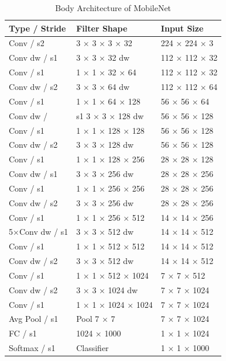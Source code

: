 \documentclass[12pt, a4paper,oneside]{report}
\begin{document}
\begin{table}[!htbp]
	\centering {} \small
	
	\begin{adjustbox}{max width=1.1\textwidth,center}
		
		\begin{tabular}{|p{3cm}|p{3cm}|p{3cm}|}
			\hline	
			Type / Stride & Filter Shape & Input Size \\ \hline
			
			Conv / s2 & 3 × 3 × 3 × 32 & 224 × 224 × 3 \\ \hline
			Conv dw / s1  &3 × 3 × 32 dw & 112 × 112 × 32 \\ \hline
			Conv / s1  & 1 × 1 × 32 × 64 & 112 × 112 × 32 \\ \hline
			Conv dw / s2 & 3 × 3 × 64 dw & 112 × 112 × 64 \\ \hline
			Conv / s1 & 1 × 1 × 64 × 128 & 56 × 56 × 64 \\ \hline
			Conv dw / & s1 3 × 3 × 128 dw & 56 × 56 × 128 \\ \hline
			Conv / s1 & 1 × 1 × 128 × 128 & 56 × 56 × 128 \\ \hline
			Conv dw / s2 & 3 × 3 × 128 dw & 56 × 56 × 128 \\ \hline
			Conv / s1 & 1 × 1 × 128 × 256 & 28 × 28 × 128 \\ \hline
			Conv dw / s1 & 3 × 3 × 256 dw & 28 × 28 × 256 \\ \hline
			Conv / s1 & 1 × 1 × 256 × 256 & 28 × 28 × 256 \\ \hline
			Conv dw / s2 & 3 × 3 × 256 dw & 28 × 28 × 256 \\ \hline
			Conv / s1 & 1 × 1 × 256 × 512 & 14 × 14 × 256 \\ \hline
			5×Conv dw / s1 & 3 × 3 × 512 dw & 14 × 14 × 512 \\ \hline
			Conv / s1 & 1 × 1 × 512 × 512 & 14 × 14 × 512 \\ \hline
			Conv dw / s2 & 3 × 3 × 512 dw &  14 × 14 × 512 \\ \hline
			Conv / s1 & 1 × 1 × 512 × 1024 & 7 × 7 × 512 \\ \hline
			Conv dw / s2 & 3 × 3 × 1024 dw & 7 × 7 × 1024 \\ \hline
			Conv / s1 & 1 × 1 × 1024 × 1024 & 7 × 7 × 1024 \\ \hline
			Avg Pool / s1  & Pool 7 × 7 & 7 × 7 × 1024 \\ \hline
			
			FC / s1 & 1024 × 1000 & 1 × 1 × 1024 \\ \hline
			Softmax / s1  & Classifier & 1 × 1 × 1000 \\ \hline
			
		\end{tabular}
		
	\end{adjustbox}
	\caption {Body Architecture of MobileNet}	
	\label{table:mobilenet1}
\end{table}
\end{document}
